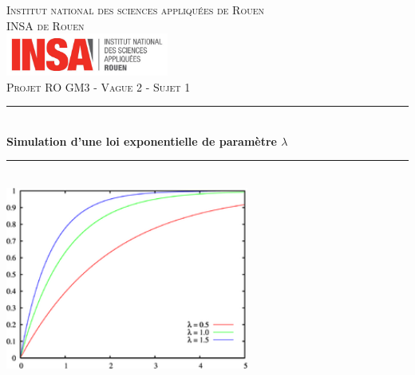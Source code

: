 \documentclass[12,french]{report}
\newcommand{\HRule}{\rule{\linewidth}{0.5mm}}
\begin{document}
\hypersetup{pdfborder=0 0 0}

\begin{titlepage}

\begin{center}
	\textsc{{\LARGE Institut national des sciences appliquées de Rouen} \\ 			\vspace{6mm} {\Large INSA de Rouen}} \\
	\vspace{5mm}
	\includegraphics[width=0.4\textwidth]{./Images/insa}\\[1.0 cm]

	\textsc{\Large Projet RO GM3 - Vague 2 - Sujet 1}\\[0.6cm]

	\HRule \\[0.5cm]
	{ \Huge \bfseries Simulation d'une loi exponentielle de paramètre $\lambda$}\\[0.2cm]
	\HRule \\[0.95cm]

	\includegraphics[width=0.6\textwidth]{./Images/Courbes_loi_exp}\\[0.9 cm]


\end{center}
\end{titlepage}
\end{document}
